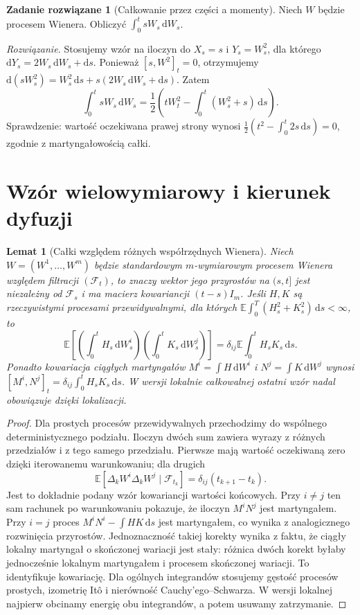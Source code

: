 \documentclass[11pt,a4paper,oneside]{report}
\numberwithin{equation}{chapter}
\theoremstyle{plain}
\newtheorem{lemat}[twierdzenie]{Lemat}
\theoremstyle{definition}
\newtheorem{zadanie}{Zadanie rozwiązane}[chapter]
\theoremstyle{remark}
\newcommand{\E}{\mathbb{E}}
\newcommand{\calF}{\mathcal{F}}
\newcommand{\dd}{\mathrm{d}}
\begin{document}
\begin{zadanie}[Całkowanie przez części a momenty]
Niech $W$ będzie procesem Wienera. Obliczyć
$\int_0^t sW_s\,\dd W_s$.

\emph{Rozwiązanie.} Stosujemy wzór na iloczyn do
$X_s=s$ i $Y_s=W_s^2$, dla którego
$\dd Y_s=2W_s\,\dd W_s+\dd s$.
Ponieważ $[s,W^2]_t=0$, otrzymujemy
$\dd(sW_s^2)=W_s^2\,\dd s+s(2W_s\,\dd W_s+\dd s)$.
Zatem
\[
\int_0^t sW_s\,\dd W_s
=\frac12\left(tW_t^2-\int_0^t(W_s^2+s)\,\dd s\right).
\]
Sprawdzenie: wartość oczekiwana prawej strony wynosi
$\frac12(t^2-\int_0^t2s\,\dd s)=0$, zgodnie z
martyngałowością całki.
\end{zadanie}

\section{Wzór wielowymiarowy i kierunek dyfuzji}
\begin{lemat}[Całki względem różnych współrzędnych Wienera]
\label{lem:multi-orthogonality}
Niech $W=(W^1,\ldots,W^m)$ będzie standardowym
$m$-wymiarowym procesem Wienera względem filtracji
$(\calF_t)$, to znaczy wektor jego przyrostów na
$(s,t]$ jest niezależny od $\calF_s$ i ma macierz
kowariancji $(t-s)I_m$. Jeśli $H,K$ są rzeczywistymi
procesami przewidywalnymi, dla których
$\E\int_0^T(H_s^2+K_s^2)\,\dd s<\infty$, to
\[
\E\left[
\left(\int_0^tH_s\,\dd W_s^i\right)
\left(\int_0^tK_s\,\dd W_s^j\right)\right]
=\delta_{ij}\E\int_0^tH_sK_s\,\dd s.
\]
Ponadto kowariacja ciągłych martyngałów
$M^i=\int H\,\dd W^i$ i
$N^j=\int K\,\dd W^j$ wynosi
$[M^i,N^j]_t=\delta_{ij}\int_0^tH_sK_s\,\dd s$.
W wersji lokalnie całkowalnej ostatni wzór nadal
obowiązuje dzięki lokalizacji.
\end{lemat}
\begin{proof}
Dla prostych procesów przewidywalnych przechodzimy do
wspólnego deterministycznego podziału. Iloczyn dwóch
sum zawiera wyrazy z różnych przedziałów i z tego
samego przedziału. Pierwsze mają wartość oczekiwaną
zero dzięki iterowanemu warunkowaniu; dla drugich
\[
\E[\Delta_kW^i\Delta_kW^j\mid\calF_{t_k}]
=\delta_{ij}(t_{k+1}-t_k).
\]
Jest to dokładnie podany wzór kowariancji wartości
końcowych. Przy $i\ne j$ ten sam rachunek po
warunkowaniu pokazuje, że iloczyn $M^iN^j$ jest
martyngałem. Przy $i=j$ proces
$M^iN^i-\int HK\,\dd s$ jest martyngałem,
co wynika z analogicznego rozwinięcia przyrostów.
Jednoznaczność takiej korekty wynika z faktu, że
ciągły lokalny martyngał o skończonej wariacji jest
stały: różnica dwóch korekt byłaby jednocześnie
lokalnym martyngałem i procesem skończonej wariacji.
To identyfikuje kowariację.
Dla ogólnych integrandów stosujemy gęstość procesów
prostych, izometrię Itô i nierówność Cauchy'ego--Schwarza.
W wersji lokalnej najpierw obcinamy energię obu
integrandów, a potem usuwamy zatrzymanie.
\end{proof}
\end{document}
